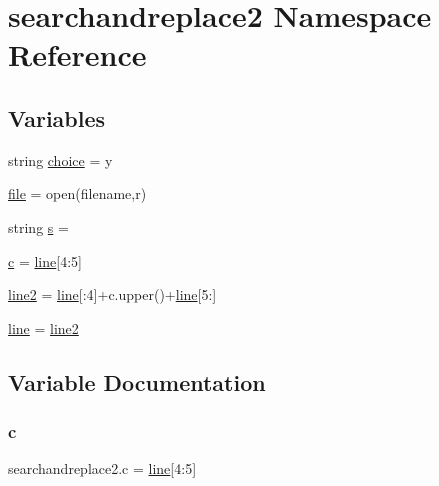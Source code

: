 \hypertarget{namespacesearchandreplace2}{}\section{searchandreplace2 Namespace Reference}
\label{namespacesearchandreplace2}
\subsection*{Variables}
\begin{DoxyCompactItemize}
\item 
string \hyperlink{namespacesearchandreplace2_a4461052f64e39e024d9f839433e02d64}{choice} = \textquotesingle{}y\textquotesingle{}
\item 
\hyperlink{namespacesearchandreplace2_a1231cf8e9e38e8d7941916846e01fe81}{file} = open(filename,\textquotesingle{}r\textquotesingle{})
\item 
string \hyperlink{namespacesearchandreplace2_a4b285c9379ff72022cc30ad075c0765f}{s} = \textquotesingle{}\textquotesingle{}
\item 
\hyperlink{namespacesearchandreplace2_ae8493641f64e296cc09f6a3a025531e9}{c} = \hyperlink{namespacesearchandreplace2_a9fd49e545069edd07cce32f78778b8cc}{line}\mbox{[}4\+:5\mbox{]}
\item 
\hyperlink{namespacesearchandreplace2_a66e997e4b7f76463e32279e6d6f15584}{line2} = \hyperlink{namespacesearchandreplace2_a9fd49e545069edd07cce32f78778b8cc}{line}\mbox{[}\+:4\mbox{]}+c.\+upper()+\hyperlink{namespacesearchandreplace2_a9fd49e545069edd07cce32f78778b8cc}{line}\mbox{[}5\+:\mbox{]}
\item 
\hyperlink{namespacesearchandreplace2_a9fd49e545069edd07cce32f78778b8cc}{line} = \hyperlink{namespacesearchandreplace2_a66e997e4b7f76463e32279e6d6f15584}{line2}
\end{DoxyCompactItemize}


\subsection{Variable Documentation}
\mbox{\label{namespacesearchandreplace2_ae8493641f64e296cc09f6a3a025531e9}} 
\subsubsection{\texorpdfstring{c}{c}}
{\footnotesize\ttfamily searchandreplace2.\+c = \hyperlink{namespacesearchandreplace2_a9fd49e545069edd07cce32f78778b8cc}{line}\mbox{[}4\+:5\mbox{]}}

